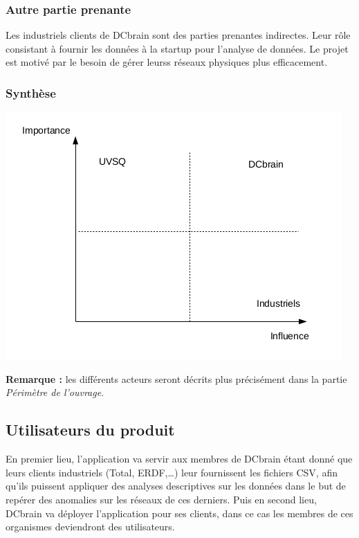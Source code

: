 			\subsubsection{Autre partie prenante}
			Les industriels clients de DCbrain sont des parties prenantes indirectes. Leur rôle consistant à fournir les données à la startup pour l'analyse de données. Le projet est motivé par le besoin de gérer leurss réseaux physiques plus efficacement.
			
			\subsubsection{Synthèse}
			\begin{center}\includegraphics[scale=0.8]{diagPP.png}\end{center}
			\textbf{Remarque :} les différents acteurs seront décrits plus précisément dans la partie \textit{Périmètre de l'ouvrage}.
			
		\subsection{Utilisateurs du produit}
		En premier lieu, l’application va servir aux membres de DCbrain étant donné que leurs clients industriels (Total, ERDF,…) leur fournissent les fichiers CSV, afin qu’ils puissent appliquer des analyses descriptives sur les données dans le but de repérer des anomalies sur les réseaux de ces derniers. Puis en second lieu, DCbrain va déployer l'application pour ses clients, dans ce cas les membres de ces organismes deviendront des utilisateurs.\\


